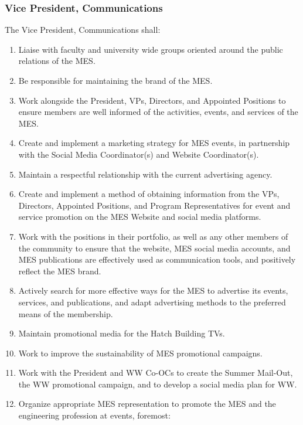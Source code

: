 \subsubsection{Vice President,
 Communications}
\label{vice-president-communications}
The Vice President, Communications shall:

\begin{enumerate}
 \item
  Liaise with faculty and university wide groups oriented around the public relations of the MES.
 \item
  Be responsible for maintaining the brand of the MES.
 \item
  Work alongside the President, VPs, Directors, and Appointed Positions to ensure members are well informed of the activities, events, and services of the MES.
 \item
  Create and implement a marketing strategy for MES events, in partnership with the Social Media Coordinator(s) and Website Coordinator(s).
 \item
  Maintain a respectful relationship with the current advertising agency.
 \item
  Create and implement a method of obtaining information from the VPs, Directors, Appointed Positions, and Program Representatives for event and service promotion on the MES Website and social media platforms.
 \item
  Work with the positions in their portfolio, as well as any other members of the community to ensure that the website, MES social media accounts, and MES publications are effectively used as communication tools, and positively reflect the MES brand.
 \item
  Actively search for more effective ways for the MES to advertise its events, services, and publications, and adapt advertising methods to the preferred means of the membership.
 \item
  Maintain promotional media for the Hatch Building TVs.
 \item
  Work to improve the sustainability of MES promotional campaigns.
 \item
  Work with the President and WW Co-OCs to create the Summer Mail-Out, the WW promotional campaign, and to develop a social media plan for WW.
 \item
  Organize appropriate MES representation to promote the MES and the engineering profession at events, foremost:


\end{enumerate}
